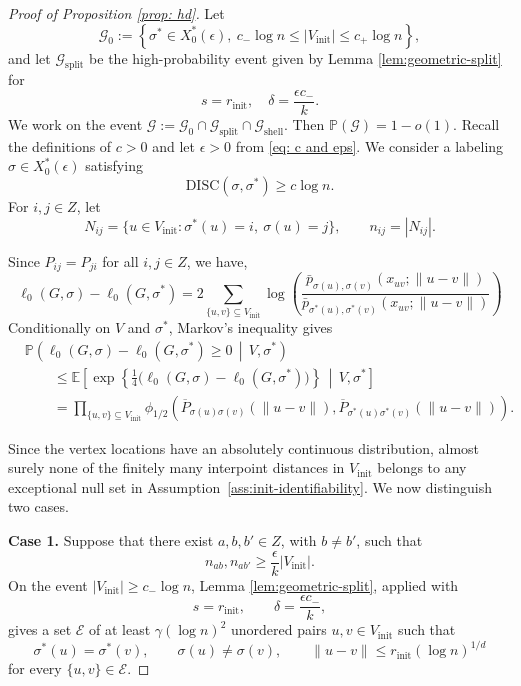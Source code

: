 \documentclass[11pt, a4paper]{amsart}
\renewcommand{\P}{\mathbb{P}}
\newcommand{\1}{\mathbf{1}}
\theoremstyle{definition}
\theoremstyle{remark}
\theoremstyle{definition}
\begin{document}
\begin{proof}[Proof of Proposition \ref{prop: hd}] 
Let
\[
\mathcal G_0
:=
\left\{
\sigma^*\in X_0^*(\epsilon),\
c_-\log n
\leq |V_{\mathrm{init}}|
\leq c_+\log n
\right\},
\]
and let $\mathcal G_{\mathrm{split}}$ be the high-probability event given by Lemma \ref{lem:geometric-split} for
\[
s=r_{\mathrm{init}},\quad \delta=\frac{\epsilon c_-}{k}.
\]
We work on the event $\mathcal G:=\mathcal G_0 \cap \mathcal G_{\mathrm{split}} \cap \mathcal G_{\mathrm{shell}}$. Then $\P(\mathcal G)=1-o(1)$.
Recall the definitions of $c>0$ and let $\epsilon>0$ from \eqref{eq: c and eps}. We consider a labeling $\sigma\in X_0^*(\epsilon)$ satisfying
\[
\mathrm{DISC}(\sigma,\sigma^*)\geq c\log n.
\]
For $i,j\in Z$, let
\[
N_{ij}
=
\{u\in V_{\mathrm{init}}:
\sigma^*(u)=i,\ \sigma(u)=j\},
\qquad
n_{ij}=|N_{ij}|.
\]

Since $P_{ij}=P_{ji}$ for all $i,j \in Z$, we have, 
\[
\ell_0(G,\sigma)-\ell_0(G,\sigma^*) = 2 \sum_{\{u,v\} \subseteq V_{\mathrm{init}}}
 \log \left( \frac{\bar{p}_{\sigma(u), \sigma(v)}(x_{uv}; \|u - v\|)}{\bar{p}_{\sigma^*(u), \sigma^*(v)}(x_{uv}; \|u - v\|)} \right)
\]
Conditionally on $V$ and $\sigma^*$, Markov's inequality gives
\begin{align}
&\mathbb P\left(
\ell_0(G,\sigma)-\ell_0(G,\sigma^*)\geq0
\,\middle|\,V,\sigma^*
\right)
\nonumber\\
&\qquad\leq
\mathbb E\left[
\exp\left\{
\frac14\bigl(
\ell_0(G,\sigma)-\ell_0(G,\sigma^*)
\bigr)
\right\}
\,\middle|\,V,\sigma^*
\right]
\nonumber\\
&\qquad=
\prod_{\{u,v\}\subseteq V_{\mathrm{init}}}
\phi_{1/2}\left(
\overline P_{\sigma(u)\sigma(v)}(\|u-v\|),
\overline P_{\sigma^*(u)\sigma^*(v)}(\|u-v\|)
\right).
\label{eq:l0diff_high}
\end{align}


Since the vertex locations have an absolutely continuous
distribution, almost surely none of the finitely many interpoint
distances in $V_{\mathrm{init}}$ belongs to any exceptional
null set in Assumption~\ref{ass:init-identifiability}.
We now distinguish two cases.
\medskip

\noindent
\textbf{Case 1.}
Suppose that there exist $a,b,b'\in Z$, with $b\neq b'$, such that
\[
n_{ab},n_{ab'}
\geq
\frac{\epsilon}{k}|V_{\mathrm{init}}|.
\]
On the event $|V_{\mathrm{init}}|\geq c_-\log n$, Lemma
\ref{lem:geometric-split}, applied with
\[
s=r_{\mathrm{init}},
\qquad
\delta=\frac{\epsilon c_-}{k},
\]
gives a set $\mathcal E$ of at least
$\gamma(\log n)^2$ unordered pairs $u,v \in V_{\mathrm{init}}$ such that
\[
\sigma^*(u)=\sigma^*(v),
\qquad
\sigma(u)\neq\sigma(v),
\qquad
\|u-v\|
\leq
r_{\mathrm{init}}(\log n)^{1/d}
\]
for every $\{u,v\}\in\mathcal E$.


\end{proof}
\end{document}
